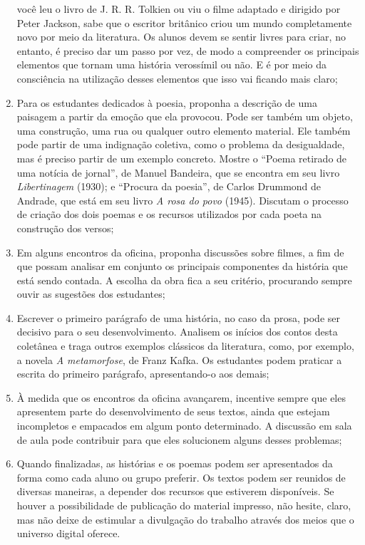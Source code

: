 \documentclass[12pt]{extarticle}
\begin{document}
\begin{enumerate}
  você leu o livro de J. R. R. Tolkien ou viu o filme adaptado e
  dirigido por Peter Jackson, sabe que o escritor britânico criou um
  mundo completamente novo por meio da literatura. Os alunos devem se
  sentir livres para criar, no entanto, é preciso dar um passo por vez,
  de modo a compreender os principais elementos que tornam uma história
  verossímil ou não. E é por meio da consciência na utilização desses
  elementos que isso vai ficando mais claro;
\item
  Para os estudantes dedicados à poesia, proponha a descrição de uma
  paisagem a partir da emoção que ela provocou. Pode ser também um
  objeto, uma construção, uma rua ou qualquer outro elemento material.
  Ele também pode partir de uma indignação coletiva, como o problema da
  desigualdade, mas é preciso partir de um exemplo concreto. Mostre o
  ``Poema retirado de uma notícia de jornal'', de Manuel Bandeira, que
  se encontra em seu livro \emph{Libertinagem} (1930); e ``Procura da
  poesia'', de Carlos Drummond de Andrade, que está em seu livro \emph{A
  rosa do povo} (1945). Discutam o processo de criação dos dois poemas e
  os recursos utilizados por cada poeta na construção dos versos;
\item
  Em alguns encontros da oficina, proponha discussões sobre filmes, a
  fim de que possam analisar em conjunto os principais componentes da
  história que está sendo contada. A escolha da obra fica a seu
  critério, procurando sempre ouvir as sugestões dos estudantes;
\item
  Escrever o primeiro parágrafo de uma história, no caso da prosa, pode
  ser decisivo para o seu desenvolvimento. Analisem os inícios dos
  contos desta coletânea e traga outros exemplos clássicos da
  literatura, como, por exemplo, a novela \emph{A metamorfose}, de Franz
  Kafka. Os estudantes podem praticar a escrita do primeiro parágrafo,
  apresentando-o aos demais;
\item
  À medida que os encontros da oficina avançarem, incentive sempre que
  eles apresentem parte do desenvolvimento de seus textos, ainda que
  estejam incompletos e empacados em algum ponto determinado. A
  discussão em sala de aula pode contribuir para que eles solucionem
  alguns desses problemas;
\item
  Quando finalizadas, as histórias e os poemas podem ser apresentados da
  forma como cada aluno ou grupo preferir. Os textos podem ser reunidos
  de diversas maneiras, a depender dos recursos que estiverem
  disponíveis. Se houver a possibilidade de publicação do material
  impresso, não hesite, claro, mas não deixe de estimular a divulgação
  do trabalho através dos meios que o universo digital oferece.
\end{enumerate}
\end{document}
